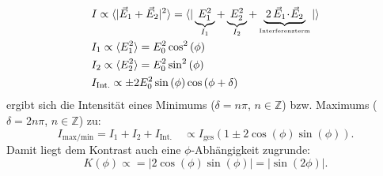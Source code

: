 \begin{align*}
	&	I 					 	\propto	 \langle |\vec{E}_{1} + \vec{E}_{2}|^2 \rangle = \langle |\underbrace{ \, E_{1}^2 \, }_{\substack{I_1}} + \underbrace{ \, E_{2}^2 \, }_{\substack{I_2}} + \underbrace{ \, 2 \, \vec{E}_{1} \! \cdot \! \vec{E}_{2} \, }_{\substack{\text{\tiny{Interferenzterm}}}} |\rangle \\
  	&	I_{1} 	\propto	 \langle E_1^2 \rangle = E_0^2  \cos^2{(\phi)}\\ %
	&	I_2 	\propto	 \langle E_2^2 \rangle = E_0^2  \sin^2{(\phi)} \\
	&	I_{\text{Int.}}	\propto	 \pm 2 E_0^2  \sin{(\phi)} \cos{(\phi + \delta)}\\
\end{align*}
ergibt sich die Intensität eines Minimums ($\delta = n \pi$, $n \in \mathbb{Z}$) bzw. Maximums ($\delta=2n\pi$, $n \in \mathbb{Z}$) zu:
\begin{equation*}
	I_{\text{max/min}} 	= I_1+I_2+I_{\text{Int.}} \quad \propto I_{\text{ges}} \left(1 \pm 2 \cos{(\phi)} \sin{(\phi)}\right).
	\label{eqn:intensity}
\end{equation*}
Damit liegt dem Kontrast auch eine $\phi$-Abhängigkeit zugrunde:
\begin{equation}
	K(\phi) \propto = | 2 \cos{(\phi)} \sin{(\phi)} | = |\sin{(2\phi)}|. %
	\label{eqn:kontrastmitwinkel}
\end{equation}

